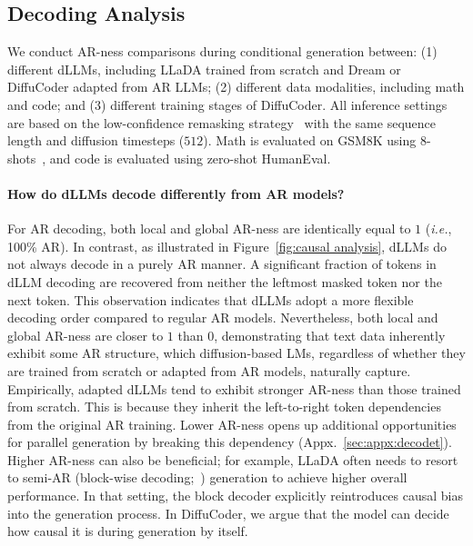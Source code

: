 \subsection{Decoding Analysis}
\label{sec:analysis}
We conduct AR-ness comparisons during conditional generation between: (1) different dLLMs, including LLaDA trained from scratch and Dream or DiffuCoder adapted from AR LLMs; (2) different data modalities, including math and code; and (3) different training stages of DiffuCoder. 
All inference settings are based on the low-confidence remasking strategy~\citep{maskgit} with the same sequence length and diffusion timesteps ($512$). Math is evaluated on GSM8K using 8-shots~\citep{cobbe2021training}, and code is evaluated using zero-shot HumanEval.

\paragraph{How do dLLMs decode differently from AR models?}
For AR decoding, both local and global AR-ness are identically equal to $1$ (\textit{i.e.}, 100\% AR). 
In contrast, as illustrated in Figure~\ref{fig:causal analysis}, dLLMs do not always decode in a purely AR manner. 
A significant fraction of tokens in dLLM decoding are recovered from neither the leftmost masked token nor the next token. 
This observation indicates that dLLMs adopt a more flexible decoding order compared to regular AR models.
Nevertheless, both local and global AR-ness are closer to $1$ than $0$, demonstrating that text data inherently exhibit some AR structure, which diffusion-based LMs, regardless of whether they are trained from scratch or adapted from AR models, naturally capture. 
Empirically, adapted dLLMs tend to exhibit stronger AR-ness than those trained from scratch. 
This is because they inherit the left-to-right token dependencies from the original AR training. 
Lower AR-ness opens up additional opportunities for parallel generation by breaking this dependency (Appx.~\ref{sec:appx:decodet}). 
Higher AR-ness can also be beneficial; for example, LLaDA often needs to resort to semi-AR (block-wise decoding;~\citealp{arriola2025block}) generation to achieve higher overall performance. 
In that setting, the block decoder explicitly reintroduces causal bias into the generation process. In DiffuCoder, we argue that the model can decide how causal it is during generation by itself.
